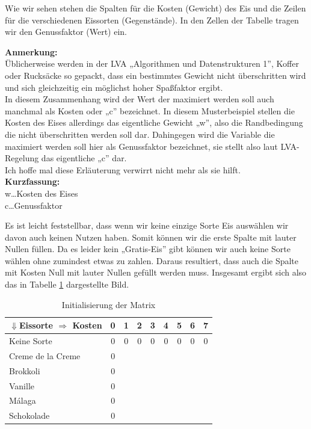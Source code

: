 \documentclass[a4paper, 12pt]{article}
\begin{document}
Wie wir sehen stehen die Spalten für die Kosten (Gewicht) des Eis und die Zeilen für die verschiedenen Eissorten (Gegenstände). In den Zellen der Tabelle tragen wir den Genussfaktor (Wert) ein.

\begin{leftbar}
	\textbf{Anmerkung:}\\

	Üblicherweise werden in der LVA „Algorithmen und Datenstrukturen 1”, Koffer oder Rucksäcke so gepackt, dass ein bestimmtes Gewicht nicht überschritten wird und sich gleichzeitig ein möglichst hoher Spaßfaktor ergibt.\\

	In diesem Zusammenhang wird der Wert der maximiert werden soll auch manchmal als Kosten oder „c” bezeichnet. In diesem Musterbeispiel stellen die Kosten des Eises allerdings das eigentliche Gewicht „w”, also die Randbedingung die nicht überschritten werden soll dar. Dahingegen wird die Variable die maximiert werden soll hier als Genussfaktor bezeichnet, sie stellt also laut LVA-Regelung das eigentliche „c” dar.\\

	Ich hoffe mal diese Erläuterung verwirrt nicht mehr als sie hilft.\\

	\textbf{Kurzfassung:}\\
	w\dots Kosten des Eises\\
	c\dots Genussfaktor
\end{leftbar}

Es ist leicht feststellbar, dass wenn wir keine einzige Sorte Eis auswählen wir davon auch keinen Nutzen haben. Somit können wir die erste Spalte mit lauter Nullen füllen. Da es leider kein „Gratis-Eis” gibt können wir auch keine Sorte wählen ohne zumindest etwas zu zahlen. Daraus resultiert, dass auch die Spalte mit Kosten Null mit lauter Nullen gefüllt werden muss. Insgesamt ergibt sich also das in Tabelle \ref{table:Initialisierung} dargestellte Bild.

\begin{table}[H]
	\begin{center}
		\begin{tabular}{l|cccccccc}
			$\Downarrow$Eissorte $\Rightarrow$ Kosten & 0 & 1 & 2 & 3 & 4 & 5 &
			6 & 7\\
			\hline
			Keine Sorte			& 0 & 0 & 0 & 0 & 0 & 0 & 0 & 0 \\
			Creme de la Creme	& 0 &	&	&	&	&	&	&	\\
			Brokkoli			& 0 &	&	&	&	&	&	&	\\
			Vanille				& 0 &	&	&	&	&	&	&	\\
			Málaga				& 0 &	&	&	&	&	&	&	\\
			Schokolade			& 0 &	&	&	&	&	&	&	\\
		\end{tabular}
	\end{center}
\caption{Initialisierung der Matrix}
\label{table:Initialisierung}
\end{table}
\end{document}
